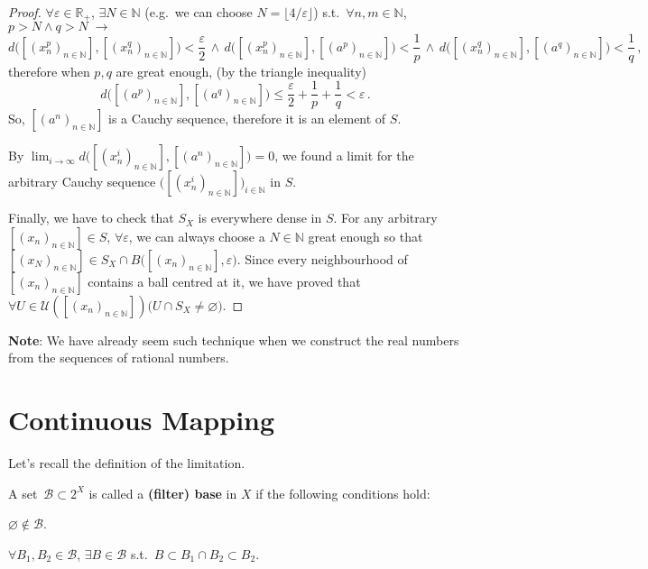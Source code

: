 \documentclass[openany]{book}
\begin{document}
\begin{proof}
	$\forall \varepsilon \in \mathbb R_+$, $\exists N \in \mathbb N$ 
		(e.g.\ we can choose $N = \lfloor 4/\varepsilon\rfloor$) 
	s.t.\ $\forall n, m \in \mathbb N$, $p > N \wedge q > N \;\to$
	\begin{equation*}
		d\big([(x^p_n)_{n \in \mathbb N}], [(x^q_n)_{n \in \mathbb N}]\big) < \frac \varepsilon 2
		\,\wedge\,
		d\big([(x^p_n)_{n \in \mathbb N}], [(a^p)_{n \in \mathbb N}]\big) < \frac 1 p
		\,\wedge\,
		d\big([(x^q_n)_{n \in \mathbb N}], [(a^q)_{n \in \mathbb N}]\big) < \frac 1 q
		\,,
	\end{equation*}
	therefore when $p, q$ are great enough, (by the triangle inequality)
	\begin{equation*}
		d\big([(a^p)_{n \in \mathbb N}], [(a^q)_{n \in \mathbb N}]\big) 
		\leq \frac \varepsilon 2 + \frac 1 p + \frac 1 q 
		< \varepsilon\,.
	\end{equation*}
	So, $[(a^n)_{n \in \mathbb N}]$ is a Cauchy sequence, therefore it is an element of $S$. 
	
	By $\lim_{i \to \infty} d\big([(x^i_n)_{n \in \mathbb N}], [(a^n)_{n \in \mathbb N}]\big) = 0$, we found a limit for the arbitrary Cauchy sequence $\big([(x^i_n)_{n \in \mathbb N}]\big)_{i \in \mathbb N}$ in $S$.

	Finally, we have to check that $S_X$ is everywhere dense in $S$. For any arbitrary $[(x_n)_{n \in \mathbb N}] \in S$, $\forall \varepsilon$, we can always choose a $N \in \mathbb N$ great enough so that $[(x_N)_{n \in \mathbb N}] \in S_X \cap B\big([(x_n)_{n \in \mathbb N}], \varepsilon\big)$. 
	Since every neighbourhood of $[(x_n)_{n \in \mathbb N}]$ contains a ball centred at it, we have proved that $\forall U \in \mathscr U([(x_n)_{n \in \mathbb N}]) \big( U \cap S_X \neq \varnothing \big)$.
\end{proof}

\textbf{Note}: We have already seem such technique when we construct the real numbers from the sequences of rational numbers.

\section{Continuous Mapping}
Let's recall the definition of the limitation.

\begin{definition}\label{definition: filter base}
	A set~$\mathscr{B} \subset 2^X$ is called a \textbf{(filter) base} in $X$ if the following conditions hold:
	\begin{conditionlist}[label=\alph*)]
		\item $\varnothing \notin \mathscr{B}$.
		\item $\forall B_1, B_2 \in \mathscr{B}$, $\exists B \in \mathscr{B}$ s.t.\ $B \subset B_1 \cap B_2 \subset B_2$. 
	\end{conditionlist}
\end{definition}
\end{document}
